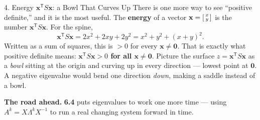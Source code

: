 \documentclass[10pt]{article}
\newcommand{\xx}{\mathbf{x}}
\newcommand{\zero}{\mathbf{0}}
\newcommand{\T}{\mathsf{T}}
\begin{document}
\begin{notesbox}{4. Energy $\xx^{\T}S\xx$: a Bowl That Curves Up}
There is one more way to see ``positive definite,'' and it is the most useful. The \textbf{energy} of a
vector $\xx=\begin{bsmallmatrix}x\\y\end{bsmallmatrix}$ is the number $\xx^{\T}S\xx$. For the spine,
\[
  \xx^{\T}S\xx = 2x^2+2xy+2y^2 = x^2+y^2+(x+y)^2.
\]
Written as a sum of squares, this is $>0$ for every $\xx\ne\zero$. That is exactly what positive definite
means: \textbf{$\xx^{\T}S\xx>0$ for all $\xx\ne\zero$}. Picture the surface $z=\xx^{\T}S\xx$ as a
\emph{bowl} sitting at the origin and curving up in every direction --- lowest point at $\zero$. A negative
eigenvalue would bend one direction \emph{down}, making a saddle instead of a bowl.

\vspace{3pt}
\textbf{The road ahead.} \textbf{6.4} puts eigenvalues to work one more time --- using
$A^k=X\Lambda^k X^{-1}$ to run a real changing system forward in time.
\end{notesbox}
\end{document}
